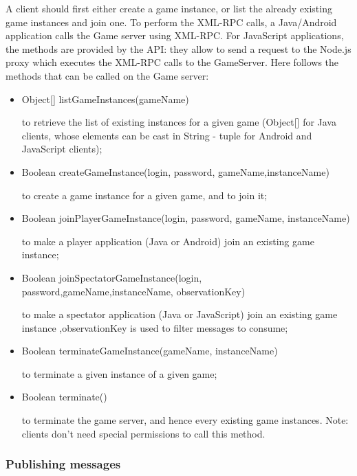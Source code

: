 A client should first either create a game instance, or list the already 
existing game instances and join one. To perform the XML-RPC calls, a 
Java/Android application calls the Game server
using XML-RPC. For JavaScript applications, the methods are 
provided by the API: they allow to send a request to the Node.js proxy which 
executes the XML-RPC calls to the GameServer. Here follows the methods that can 
be called on the Game server:

\begin{itemize}
\item 
\begin{shellcmd} 
Object[] listGameInstances(gameName)
\end{shellcmd} 
 to retrieve the list of existing instances for a given game (Object[]
 for Java clients, whose elements can be cast in String - tuple for
 Android and JavaScript clients);
\item 
\begin{shellcmd}
Boolean createGameInstance(login, password, gameName,instanceName)
\end{shellcmd} 
to create a game instance for a given game, and to join it;
\item 
\begin{shellcmd}
Boolean joinPlayerGameInstance(login, password, gameName, instanceName)
\end{shellcmd} 
to make a player application (Java or Android) join an existing game instance;
\item 
\begin{shellcmd}
Boolean joinSpectatorGameInstance(login, password,gameName,instanceName, observationKey)
\end{shellcmd} 
to make a spectator application (Java or JavaScript) join an existing game
instance ,observationKey is used to filter messages to consume;
\item 
\begin{shellcmd}
Boolean terminateGameInstance(gameName, instanceName)
\end{shellcmd} 
to terminate a given instance of a given game;
\item 
\begin{shellcmd}
Boolean terminate()
\end{shellcmd} 
to terminate the game server, and hence every existing game
instances. Note: clients don't need special permissions to call this
method.
\end{itemize}

\subsubsection{Publishing messages}

